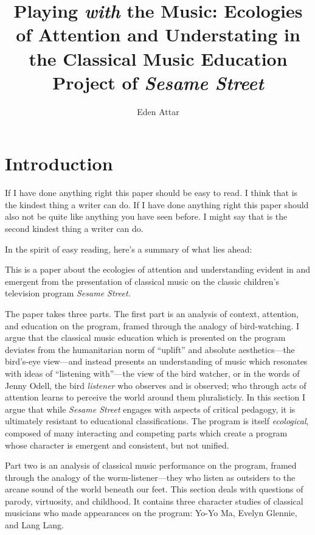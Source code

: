 \documentclass[12pt,letterpaper]{article}
\begin{document}
	
	\title{Playing \textit{with} the Music: Ecologies of Attention and Understating 
	in the Classical Music Education Project of \textit{Sesame Street}}
	\author{Eden Attar}
	\maketitle
	\doublespacing
	\thispagestyle{empty}
	\newpage
	\clearpage
	\setcounter{page}{1}
	\thispagestyle{empty}

	\section*{Introduction}	

	If I have done anything right this paper should be easy to read. I
	think that is the kindest thing a writer can do. If I have
	done anything right this paper should also not be quite like anything 
	you have seen before. I might say that is the second kindest thing a 
	writer can do.  

	In the spirit of easy reading, here's a summary of what lies ahead:

	This is a paper about the ecologies of attention and understanding 
	evident in and emergent from the presentation of classical music on the
	classic children's television program \textit{Sesame Street.}  
	
	The paper takes three parts. The first part is an analysis of context,
	attention, and education on the program, framed through the analogy of
	bird-watching. I argue that the classical music education which is 
	presented on the program deviates from the humanitarian norm of 
	``uplift'' and absolute aesthetics---the bird's-eye view---and instead
	presents an understanding of music which resonates with ideas of 
	``listening with''---the view of the bird watcher, or in the words of
	Jenny Odell, the bird \textit{listener} who observes and is observed;
	who through acts of attention learns to perceive the world around them
	pluralisticly. In this section I argue that while \textit{Sesame
	Street} engages with aspects of critical pedagogy, it is ultimately 
	resistant to educational classifications. The program is itself
	\textit{ecological}, composed of many interacting and competing parts
	which create a program whose character is emergent and consistent, but
	not unified.   

	Part two is an analysis of classical music performance on the program, 
	framed through the analogy of the worm-listener---they who listen as 
	outsiders to 
	the arcane sound of the world beneath our feet. This section deals with
	questions of parody, virtuosity, and childhood. It contains three
	character studies of classical musicians who made appearances on the
	program: Yo-Yo Ma, Evelyn Glennie, and Lang Lang.   
\end{document}
